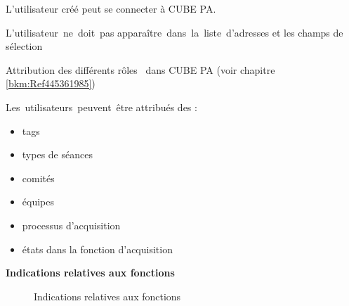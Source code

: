 \begin{small}
\begin{raggedright}

L'utilisateur créé peut se connecter à CUBE PA.

\vspace{\baselineskip}

\mbox{L'utilisateur ne doit pas} 
\mbox{apparaître dans la liste d'adresses}
 et les champs de sélection

\vspace{\baselineskip}

Attribution des différents rôles \
dans CUBE PA (voir chapitre \ref{bkm:Ref445361985})

\vspace{\baselineskip}
\vspace{\baselineskip}
\vspace{\baselineskip}

\mbox{Les utilisateurs peuvent être}
attribués des :

\vspace{\baselineskip}

\begin{itemize}
\item tags
\vspace{\baselineskip}
\vspace{\baselineskip}
\item types de séances
\vspace{\baselineskip}
\item comités
\item équipes
\item processus d'acquisition
\item états dans la \newline fonction d'acquisition
\end{itemize}

\vspace{\baselineskip}


\end{raggedright}
\end{small}

\raggedright{}

\clearpage
\textbf{Indications relatives aux fonctions}

\begin{figure}[H]
\caption{Indications relatives aux fonctions}
\end{figure}

